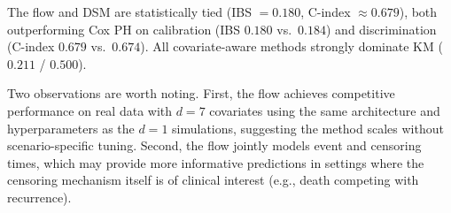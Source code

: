 The flow and DSM are statistically tied (IBS $= 0.180$, C-index
$\approx 0.679$), both outperforming Cox PH on calibration (IBS $0.180$
vs.\ $0.184$) and discrimination (C-index $0.679$ vs.\ $0.674$). All
covariate-aware methods strongly dominate KM ($0.211$ / $0.500$).

Two observations are worth noting. First, the flow achieves competitive
performance on real data with $d = 7$ covariates using the same
architecture and hyperparameters as the $d = 1$ simulations, suggesting
the method scales without scenario-specific tuning. Second, the flow
jointly models event and censoring times, which may provide more
informative predictions in settings where the censoring mechanism itself
is of clinical interest (e.g., death competing with recurrence).
